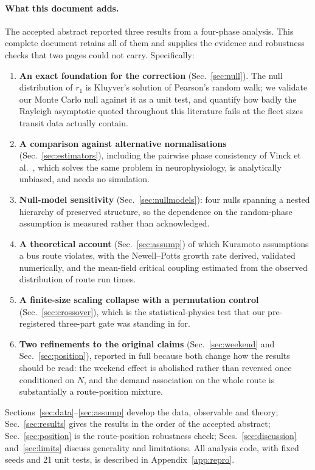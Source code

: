 \documentclass[9pt,twocolumn,twoside]{opticajnl}
\begin{document}
\paragraph{What this document adds.} The accepted abstract reported three results from a
four-phase analysis. This complete document retains all of them and supplies the evidence and
robustness checks that two pages could not carry. Specifically:
\begin{enumerate}\itemsep1pt
\item \textbf{An exact foundation for the correction} (Sec.~\ref{sec:null}). The null
      distribution of $r_1$ is Kluyver's solution of Pearson's random walk; we validate our
      Monte Carlo null against it as a unit test, and quantify how badly the Rayleigh asymptotic
      quoted throughout this literature fails at the fleet sizes transit data actually contain.
\item \textbf{A comparison against alternative normalisations} (Sec.~\ref{sec:estimators}),
      including the pairwise phase consistency of Vinck et al.\ \cite{vinck10}, which solves the
      same problem in neurophysiology, is analytically unbiased, and needs no simulation.
\item \textbf{Null-model sensitivity} (Sec.~\ref{sec:nullmodels}): four nulls spanning a nested
      hierarchy of preserved structure, so the dependence on the random-phase assumption is
      measured rather than acknowledged.
\item \textbf{A theoretical account} (Sec.~\ref{sec:assump}) of which Kuramoto assumptions a bus
      route violates, with the Newell--Potts growth rate derived, validated numerically, and the
      mean-field critical coupling estimated from the observed distribution of route run times.
\item \textbf{A finite-size scaling collapse with a permutation control}
      (Sec.~\ref{sec:crossover}), which is the statistical-physics test that our pre-registered
      three-part gate was standing in for.
\item \textbf{Two refinements to the original claims} (Sec.~\ref{sec:weekend} and
      Sec.~\ref{sec:position}), reported in full because both change how the results should be
      read: the weekend effect is abolished rather than reversed once conditioned on $N$, and
      the demand association on the whole route is substantially a route-position mixture.
\end{enumerate}
Sections~\ref{sec:data}--\ref{sec:assump} develop the data, observable and theory;
Sec.~\ref{sec:results} gives the results in the order of the accepted abstract;
Sec.~\ref{sec:position} is the route-position robustness check; Secs.~\ref{sec:discussion}
and~\ref{sec:limits} discuss generality and limitations. All analysis code, with fixed seeds and
21 unit tests, is described in Appendix~\ref{app:repro}.
\end{document}
